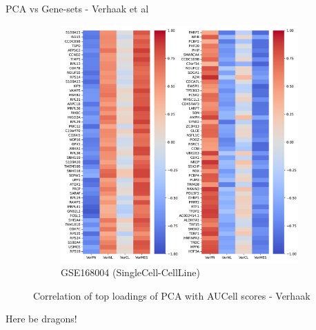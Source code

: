 \documentclass[aspectratio=169,9pt]{beamer}
\begin{document}
\begin{frame}{PCA vs Gene-sets - Verhaak et al}
\begin{adjustwidth}{-5cm}{-5cm}
\begin{figure}
\begin{subfigure}[c]{0.48\textwidth}
                    \includegraphics[width=\textwidth]{mgg23_load-corr_Ver}
                    \caption{GSE168004 (SingleCell-CellLine)}
                \end{subfigure}
                \caption{Correlation of top loadings of PCA with AUCell scores - Verhaak}
            \end{figure}
        \end{adjustwidth}
    \end{frame}

    \begin{frame}
        Here be dragons!
    \end{frame}
\end{document}
